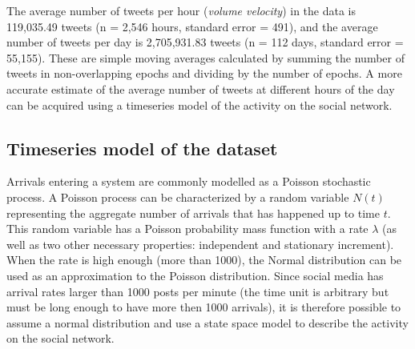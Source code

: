 \documentclass[letterpaper,12pt,titlepage,oneside,final]{book}
\begin{document}


The average number of tweets per hour  (\emph{volume velocity}) in the data is 119,035.49 tweets 
(n = 2,546 hours, standard error = 491), 
and the average number of tweets per day is 2,705,931.83 tweets 
(n = 112 days, standard error = 55,155). 
These are simple moving averages calculated by summing the number of tweets in 
non-overlapping epochs and dividing by the number of epochs.
A more accurate estimate of the average number
of tweets at different hours of the day 
can be acquired using a timeseries model
of the activity on the social network.

\subsection{Timeseries model of the dataset}
Arrivals entering a system are commonly modelled as
a Poisson stochastic process.
A Poisson process can be 
characterized by a random variable $N(t)$ %
representing the aggregate number of arrivals 
that has happened up to time $t$.
This random variable has a Poisson probability mass function
with a rate $\lambda$
(as well as two other necessary properties: independent and stationary increment).
When the rate is high enough (more than 1000), 
the Normal distribution can be used as an approximation
to the Poisson distribution. 
Since social media has arrival rates larger than 1000
posts per minute 
(the time unit is arbitrary but must be long enough to have more then 1000 arrivals),
it is therefore possible to assume a normal distribution
and use a state space model 
to describe the activity on the social network.
\end{document}
